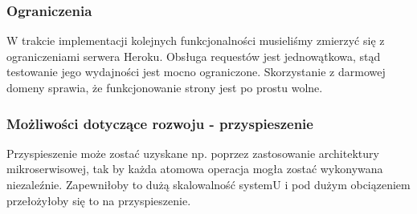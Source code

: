\subsubsection{Ograniczenia}
W trakcie implementacji kolejnych funkcjonalności musieliśmy zmierzyć się z ograniczeniami serwera Heroku. Obsługa requestów jest jednowątkowa, stąd testowanie jego wydajności jest mocno ograniczone.
Skorzystanie z darmowej domeny sprawia, że funkcjonowanie strony jest po prostu wolne.

\subsubsection{Możliwości dotyczące rozwoju - przyspieszenie}
Przyspieszenie może zostać uzyskane np. poprzez zastosowanie architektury mikroserwisowej, tak by każda atomowa operacja mogła zostać wykonywana niezaleźnie. Zapewniłoby to dużą skalowalność systemU i pod dużym obciązeniem przełożyłoby się to na przyspieszenie. 

\todo

